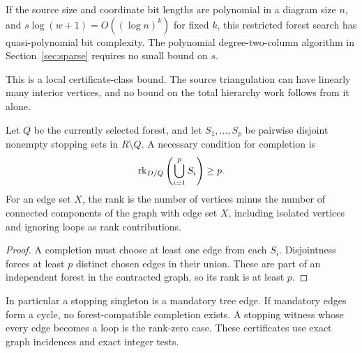 \begin{corollary}
If the source size and coordinate bit lengths are polynomial in a diagram
size $n$, and $s\log(w+1)=O((\log n)^k)$ for fixed $k$, this restricted
forest search has quasi-polynomial bit complexity.  The polynomial
degree-two-column algorithm in Section~\ref{sec:sparse} requires no small
bound on $s$.
\end{corollary}
This is a local certificate-class bound.  The source triangulation can have
linearly many interior vertices, and no bound on the total hierarchy work
follows from it alone.

\begin{proposition}\label{prop:packing}
Let $Q$ be the currently selected forest, and let
$S_1,\ldots,S_p$ be pairwise disjoint nonempty stopping sets in
$R\setminus Q$.  A necessary condition for completion is
\begin{equation}\label{eq:packing}
       \operatorname{rk}_{D/Q}\left(\bigcup_{i=1}^p S_i\right)\geq p.
\end{equation}
For an edge set $X$, the rank is the number of vertices minus the number
of connected components of the graph with edge set $X$, including isolated
vertices and ignoring loops as rank contributions.
\end{proposition}
\begin{proof}
A completion must choose at least one edge from each $S_i$.  Disjointness
forces at least $p$ distinct chosen edges in their union.  These are part
of an independent forest in the contracted graph, so its rank is at
least $p$.
\end{proof}
In particular a stopping singleton is a mandatory tree edge.  If mandatory
edges form a cycle, no forest-compatible completion exists.  A stopping
witness whose every edge becomes a loop is the rank-zero case.  These
certificates use exact graph incidences and exact integer tests.

